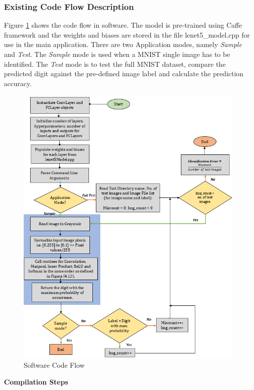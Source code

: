\subsubsection{Existing Code Flow Description}
\label{3_1_2_2}
Figure \ref{fig:CPP_flow_lenet5} shows the code flow in software. The model is pre-trained using Caffe framework and the weights and biases are stored in the file lenet5\_model.cpp for use in the main application.\newline
There are two Application modes, namely \textit{Sample} and \textit{Test}. The \textit{Sample} mode is used when a MNIST single image has to be identified. The \textit{Test} mode is to test the full MNIST dataset, compare the predicted digit against the pre-defined image label and calculate the prediction accuracy.\newline\newline
\begin{figure}[h!]
\centering
\includegraphics[width=\linewidth]{figures/CPP_flow_lenet5.png}
\caption{Software Code Flow
\cite{papaa-opencl}}
\label{fig:CPP_flow_lenet5}
\end{figure}\textbf{Compilation Steps \cite{papaa-opencl}} \newline\newline

